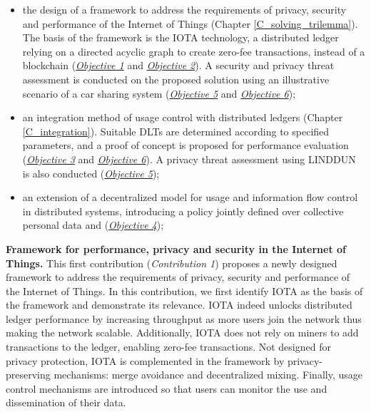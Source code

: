 \begin{itemize}
    \item the design of a framework to address the requirements of privacy, security and performance of the Internet of
Things (Chapter \ref{C_solving_trilemma}). The basis of the framework is the IOTA technology, a distributed ledger relying on a directed acyclic graph to create zero-fee transactions, instead of a blockchain (\hyperref[obj:1]{\emph{Objective 1}} and \hyperref[obj:23]{\emph{Objective 2}}). A security and privacy threat assessment is conducted on the proposed solution using an illustrative scenario of a car sharing system (\hyperref[obj:56]{\emph{Objective 5}} and \hyperref[obj:56]{\emph{Objective 6}});
\item an integration method of usage control with distributed ledgers (Chapter \ref{C_integration}). Suitable DLTs are determined according to specified parameters, and a proof of concept is proposed for performance evaluation (\hyperref[obj:23]{\emph{Objective 3}} and \hyperref[obj:56]{\emph{Objective 6}}). A privacy threat assessment using LINDDUN is also conducted (\hyperref[obj:56]{\emph{Objective 5}});
\item an extension of a decentralized model for usage and
information flow control in distributed systems, introducing a policy jointly defined over collective personal data and  (\hyperref[obj:4]{\emph{Objective 4}});
\end{itemize}

\textbf{Framework for performance, privacy and security in the Internet of Things. } 
This first contribution (\emph{Contribution 1}) proposes a newly designed framework to address the requirements of privacy, security and
performance of the Internet of Things. In this contribution, we first identify IOTA as the basis of the framework and demonstrate its relevance. IOTA indeed unlocks distributed ledger performance by increasing throughput as more users join the
network thus making the network scalable. Additionally, IOTA does not rely on miners to add transactions to the ledger, enabling zero-fee transactions. Not designed for privacy protection, IOTA is complemented in the framework by privacy-preserving mechanisms: merge avoidance
and decentralized mixing. Finally, usage control mechanisms are introduced so that users can monitor the use and dissemination of their data.

